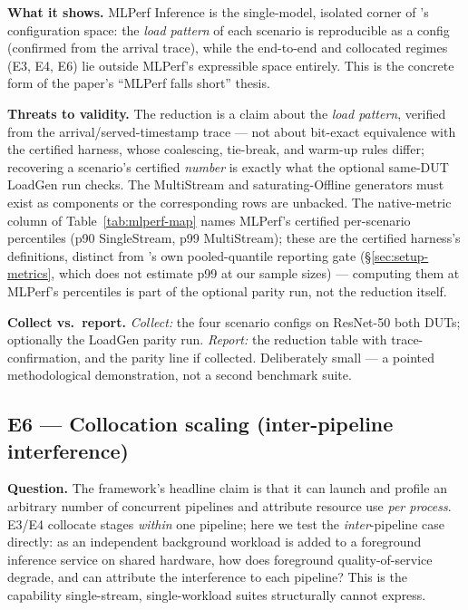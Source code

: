 \textbf{What it shows.} MLPerf Inference is the single-model, isolated
corner of \sysname{}'s configuration space: the \emph{load pattern} of each
scenario is reproducible as a \sysname{} config (confirmed from the arrival
trace), while the end-to-end and collocated regimes (E3, E4, E6) lie
outside MLPerf's expressible space entirely. This is the concrete form of
the paper's ``MLPerf falls short'' thesis.

\textbf{Threats to validity.} The reduction is a claim about the
\emph{load pattern}, verified from the arrival/served-timestamp trace ---
not about bit-exact equivalence with the certified harness, whose
coalescing, tie-break, and warm-up rules differ; recovering a scenario's
certified \emph{number} is exactly what the optional same-DUT LoadGen run
checks. The MultiStream and saturating-Offline generators must exist as
components or the corresponding rows are unbacked. The native-metric column
of Table~\ref{tab:mlperf-map} names MLPerf's certified per-scenario
percentiles (p90 SingleStream, p99 MultiStream); these are the certified
harness's definitions, distinct from \sysname{}'s own pooled-quantile
reporting gate (\S\ref{sec:setup-metrics}, which does not estimate p99 at
our sample sizes) --- computing them at MLPerf's percentiles is part of the
optional parity run, not the reduction itself.

\textbf{Collect vs.\ report.} \emph{Collect:} the four scenario configs on
ResNet-50 both DUTs; optionally the LoadGen parity run. \emph{Report:} the
reduction table with trace-confirmation, and the parity line if collected.
Deliberately small --- a pointed methodological demonstration, not a second
benchmark suite.

\subsection{E6 --- Collocation scaling (inter-pipeline interference)}
\label{sec:e6-collocation}

\textbf{Question.} The framework's headline claim is that it can launch and
profile an arbitrary number of concurrent pipelines and attribute
resource use \emph{per process}. E3/E4 collocate stages \emph{within} one
pipeline; here we test the \emph{inter}-pipeline case directly: as an
independent background workload is added to a foreground inference service
on shared hardware, how does foreground quality-of-service degrade, and
can \sysname{} attribute the interference to each pipeline? This is the
capability single-stream, single-workload suites structurally cannot
express.

